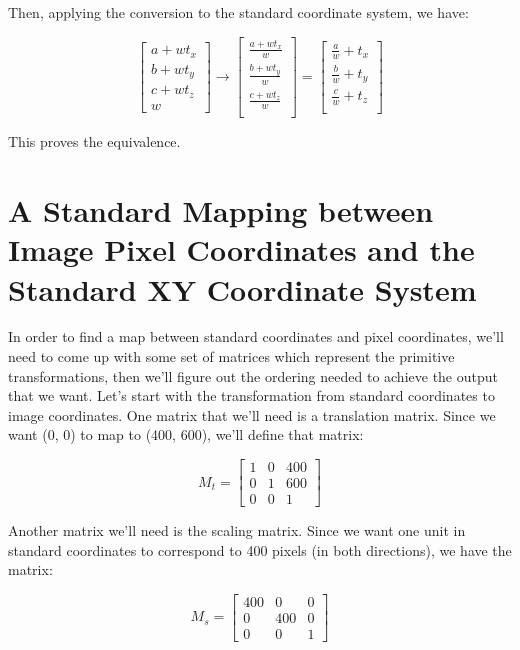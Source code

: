 \documentclass{article}
\begin{document}
Then, applying the conversion to the standard coordinate system, we have:

$$\begin{bmatrix}
a + w t_x \\
b + w t_y \\
c + w t_z \\
w
\end{bmatrix} \rightarrow \begin{bmatrix}
\frac{a + w t_x}{w} \\
\frac{b + w t_y}{w} \\
\frac{c + w t_z}{w} \\
\end{bmatrix} = \begin{bmatrix}
\frac{a}{w} + t_x \\
\frac{b}{w} + t_y \\
\frac{c}{w} + t_z \\
\end{bmatrix}
$$

This proves the equivalence.

\section{A Standard Mapping between Image Pixel Coordinates and the Standard XY Coordinate System}

In order to find a map between standard coordinates and pixel coordinates, we'll 
need to come up with 
some set of matrices which represent the primitive transformations, then we'll 
figure out the ordering needed to achieve 
the output that we want. Let's start with the transformation from standard coordinates 
to image coordinates. One matrix that we'll need is a translation matrix. Since we want 
(0, 0) to map to (400, 600), we'll define that matrix:

$$
M_t = \begin{bmatrix}
1 & 0 & 400 \\
0 & 1 & 600 \\
0 & 0 &   1
\end{bmatrix}
$$

Another matrix we'll need is the scaling matrix. Since we want one unit in 
standard coordinates to correspond to 400 pixels (in both directions), we have 
the matrix:

$$
M_s = \begin{bmatrix}
400 &   0 & 0 \\
  0 & 400 & 0 \\
  0 &   0 & 1
\end{bmatrix}
$$
\end{document}
